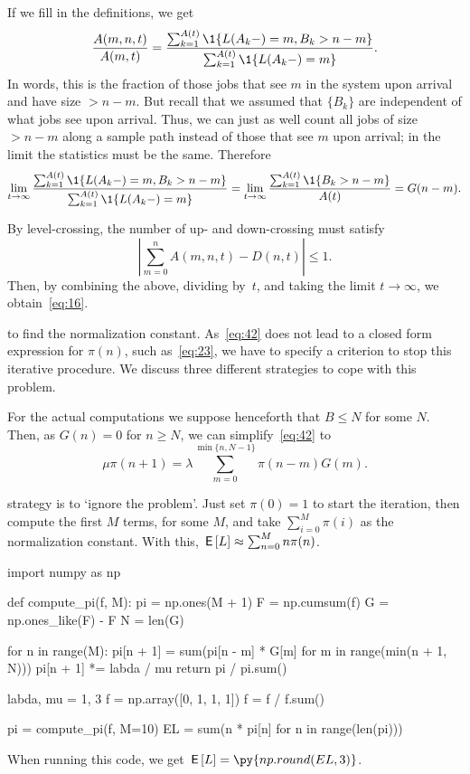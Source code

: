 If we fill in the definitions, we get
\begin{equation*}
 \frac{A(m,n,t)}{A(m,t)} =  \frac{\sum_{k=1}^{A(t)}\1{\L(A_k-) = m, B_k > n-m}}
{\sum_{k=1}^{A(t)}\1{\L(A_k-) = m}}.
\end{equation*}
In words, this is the fraction of those jobs that see $m$ in the system upon arrival and have size $> n-m$.
But recall that we assumed that  $\{B_k\}$  are independent of what jobs see upon arrival.
Thus, we can just as well count all jobs of size $>n-m$ along a sample path instead of those that see $m$ upon arrival; in the limit the statistics must be the same. Therefore
\begin{equation*}
\lim_{t\to\infty}  \frac{\sum_{k=1}^{A(t)}\1{\L(A_k-) = m, B_k > n-m}}
{\sum_{k=1}^{A(t)}\1{\L(A_k-) = m}} = \lim_{t\to\infty}
\frac{\sum_{k=1}^{A(t)}\1{B_k > n-m}}{A(t)}= G(n-m).
\end{equation*}


By level-crossing, the number of up- and down-crossing  must satisfy
\begin{equation*}
\left|\sum_{m=0}^n A(m,n,t) -  D(n,t)\right| \leq 1.
\end{equation*}
Then, by combining the above, dividing by~$t$, and taking the limit $t\to\infty$, we obtain~\cref{eq:16}.


 to find the normalization constant.
As~\cref{eq:42} does not lead to a closed form expression for $\pi(n)$, such as~\cref{eq:23}, we have to specify a criterion to stop this iterative procedure.
We discuss three different strategies to cope with this problem.

For the actual computations we suppose henceforth that $B\leq N$ for some $N$.
Then, as $G(n)=0$ for $n\geq N$, we can simplify~\cref{eq:42} to
\begin{equation*}
\mu \pi(n+1) = \lambda \sum_{m=0}^{\min\{n, N-1\}} \pi(n-m) G(m).
\end{equation*}



 strategy is to `ignore the problem'.
Just set $\pi(0)=1$ to start the iteration, then compute the first $M$ terms, for some $M$, and take $\sum_{i=0}^M \pi(i)$ as the normalization constant.
With this, $\,\mathsf{E}\left[L\right] \approx \sum_{n=0}^M n \pi(n)$.

\begin{pyblock}[][numbers=left,frame=lines]
import numpy as np


def compute_pi(f, M):
    pi = np.ones(M + 1)
    F = np.cumsum(f)
    G = np.ones_like(F) - F
    N = len(G)

    for n in range(M):
        pi[n + 1] = sum(pi[n - m] * G[m] for m in range(min(n + 1, N)))
        pi[n + 1] *= labda / mu
    return pi / pi.sum()

labda, mu = 1, 3
f = np.array([0, 1, 1, 1])
f = f / f.sum()

pi = compute_pi(f, M=10)
EL = sum(n * pi[n] for n in range(len(pi)))
\end{pyblock}
When running this code, we get $\E\L = \py{np.round(EL,3)}$.

